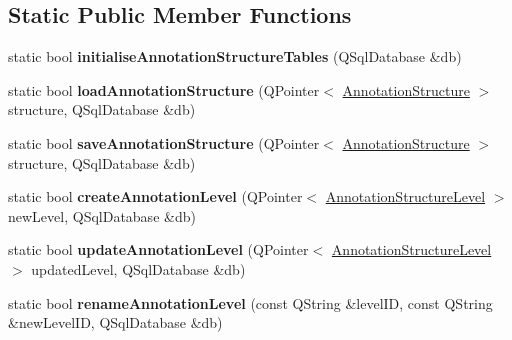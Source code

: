 \subsection*{Static Public Member Functions}
\begin{DoxyCompactItemize}
\item 
\mbox{\label{class_s_q_l_serialiser_annotation_structure_af3d274ea947133939b74001ddd555104}} 
static bool {\bfseries initialise\+Annotation\+Structure\+Tables} (Q\+Sql\+Database \&db)
\item 
\mbox{\label{class_s_q_l_serialiser_annotation_structure_a9fed85fe4fb005ef3d8db838aee825a8}} 
static bool {\bfseries load\+Annotation\+Structure} (Q\+Pointer$<$ \hyperlink{class_annotation_structure}{Annotation\+Structure} $>$ structure, Q\+Sql\+Database \&db)
\item 
\mbox{\label{class_s_q_l_serialiser_annotation_structure_a355116eca8c34d84742cbcf29ee3139d}} 
static bool {\bfseries save\+Annotation\+Structure} (Q\+Pointer$<$ \hyperlink{class_annotation_structure}{Annotation\+Structure} $>$ structure, Q\+Sql\+Database \&db)
\item 
\mbox{\label{class_s_q_l_serialiser_annotation_structure_a1741a5553fee4ee4c7b3c19ed6c3c357}} 
static bool {\bfseries create\+Annotation\+Level} (Q\+Pointer$<$ \hyperlink{class_annotation_structure_level}{Annotation\+Structure\+Level} $>$ new\+Level, Q\+Sql\+Database \&db)
\item 
\mbox{\label{class_s_q_l_serialiser_annotation_structure_a77e6010895bfb3368fbfe7e6c548f4f4}} 
static bool {\bfseries update\+Annotation\+Level} (Q\+Pointer$<$ \hyperlink{class_annotation_structure_level}{Annotation\+Structure\+Level} $>$ updated\+Level, Q\+Sql\+Database \&db)
\item 
\mbox{\label{class_s_q_l_serialiser_annotation_structure_a1a092f0a5a58c6be4520eaf4a02a69f9}} 
static bool {\bfseries rename\+Annotation\+Level} (const Q\+String \&level\+ID, const Q\+String \&new\+Level\+ID, Q\+Sql\+Database \&db)
\item 

\end{DoxyCompactItemize}

